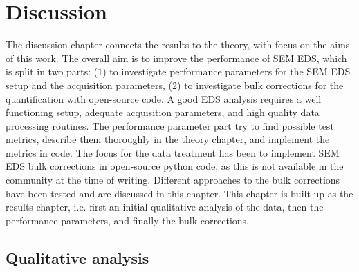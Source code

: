 %
\chapter{Discussion}
\label{ch:discussion}


The discussion chapter connects the results to the theory, with focus on the aims of this work.
The overall aim is to improve the performance of SEM EDS, which is split in two parts:
($1$) to investigate performance parameters for the SEM EDS setup and the acquisition parameters, ($2$) to investigate bulk corrections for the quantification with open-source code.
A good EDS analysis requires a well functioning setup, adequate acquisition parameters, and high quality data processing routines.
The performance parameter part try to find possible test metrics, describe them thoroughly in the theory chapter, and implement the metrics in code.
The focus for the data treatment has been to implement SEM EDS bulk corrections in open-source python code, as this is not available in the community at the time of writing.
Different approaches to the bulk corrections have been tested and are discussed in this chapter.
This chapter is built up as the results chapter, i.e. first an initial qualitative analysis of the data, then the performance parameters, and finally the bulk corrections.











\section{Qualitative analysis}
\label{discussion:qualitative_analysis}


